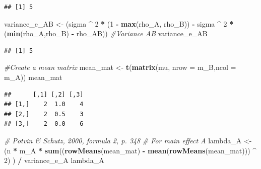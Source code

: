 \documentclass[
]{book}
\newenvironment{Shaded}{\begin{snugshade}}{\end{snugshade}}
\newcommand{\CommentTok}[1]{\textcolor[rgb]{0.56,0.35,0.01}{\textit{#1}}}
\newcommand{\DataTypeTok}[1]{\textcolor[rgb]{0.13,0.29,0.53}{#1}}
\newcommand{\DecValTok}[1]{\textcolor[rgb]{0.00,0.00,0.81}{#1}}
\newcommand{\KeywordTok}[1]{\textcolor[rgb]{0.13,0.29,0.53}{\textbf{#1}}}
\newcommand{\NormalTok}[1]{#1}
\newcommand{\OperatorTok}[1]{\textcolor[rgb]{0.81,0.36,0.00}{\textbf{#1}}}
\newcommand{\StringTok}[1]{\textcolor[rgb]{0.31,0.60,0.02}{#1}}
\begin{document}
\begin{verbatim}
## [1] 5
\end{verbatim}

\begin{Shaded}
\begin{Highlighting}[]
\NormalTok{variance_e_AB <-}
\StringTok{  }\NormalTok{(sigma }\OperatorTok{^}\StringTok{ }\DecValTok{2} \OperatorTok{*}\StringTok{ }\NormalTok{(}\DecValTok{1} \OperatorTok{-}\StringTok{ }\KeywordTok{max}\NormalTok{(rho_A, rho_B)) }\OperatorTok{-}\StringTok{ }
\StringTok{     }\NormalTok{sigma }\OperatorTok{^}\StringTok{ }\DecValTok{2} \OperatorTok{*}\StringTok{ }\NormalTok{(}\KeywordTok{min}\NormalTok{(rho_A,rho_B) }\OperatorTok{-}\StringTok{ }\NormalTok{rho_AB)) }
\CommentTok{#Variance AB}
\NormalTok{variance_e_AB}
\end{Highlighting}
\end{Shaded}

\begin{verbatim}
## [1] 5
\end{verbatim}

\begin{Shaded}
\begin{Highlighting}[]
\CommentTok{#Create a mean matrix}
\NormalTok{mean_mat <-}\StringTok{ }\KeywordTok{t}\NormalTok{(}\KeywordTok{matrix}\NormalTok{(mu, }\DataTypeTok{nrow =}\NormalTok{ m_B,}\DataTypeTok{ncol =}\NormalTok{ m_A)) }
\NormalTok{mean_mat}
\end{Highlighting}
\end{Shaded}

\begin{verbatim}
##      [,1] [,2] [,3]
## [1,]    2  1.0    4
## [2,]    2  0.5    3
## [3,]    2  0.0    6
\end{verbatim}

\begin{Shaded}
\begin{Highlighting}[]
\CommentTok{# Potvin & Schutz, 2000, formula 2, p. 348}
\CommentTok{# For main effect A}
\NormalTok{lambda_A <-}
\StringTok{  }\NormalTok{(n }\OperatorTok{*}\StringTok{ }\NormalTok{m_A }\OperatorTok{*}\StringTok{ }\KeywordTok{sum}\NormalTok{((}\KeywordTok{rowMeans}\NormalTok{(mean_mat) }\OperatorTok{-}\StringTok{ }
\StringTok{                   }\KeywordTok{mean}\NormalTok{(}\KeywordTok{rowMeans}\NormalTok{(mean_mat))) }\OperatorTok{^}\StringTok{ }\DecValTok{2}\NormalTok{) ) }\OperatorTok{/}\StringTok{ }\NormalTok{variance_e_A}
\NormalTok{  lambda_A}
\end{Highlighting}
\end{Shaded}
\end{document}
